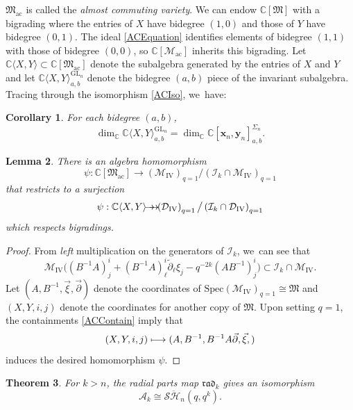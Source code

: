 \documentclass[JEP,XML,SOM,Unicode,published]{cedram}
\newcommand\mto{\mathchoice{\longmapsto}{\mapsto}{\mapsto}{\mapsto}}
\newcommand{\onto}{\mathchoice{\to\hspace*{-5mm}\to}{\to\hspace*{-2.85mm}\to}{\to\hspace*{-3mm}\to}{\to\hspace*{-3mm}\to}}
\newcommand{\GL}{\mathrm{GL}}
\newtheorem{thm}{Theorem}[section]
\newtheorem{lem}[thm]{Lemma}
\newtheorem{cor}[thm]{Corollary}
\theoremstyle{definition}
\newcommand{\CC}{\mathbb{C}}
\newcommand{\DD}{\mathcal{D}}
\newcommand{\AAA}{\mathcal{A}}
\newcommand{\MM}{\mathcal{M}}
\newcommand{\SHH}{\mathcal{S}\ddot{\mathcal{H}}}
\begin{document}
$\mathfrak{M}_{\textrm{ac}}$ is called the \textit{almost commuting variety}.
We can endow $\CC[\mathfrak{M}]$ with a bigrading where the entries of $X$ have bidegree $(1,0)$ and those of $Y$ have bidegree $(0,1)$.
The ideal \eqref{ACEquation} identifies elements of bidegree $(1,1)$ with those of bidegree $(0,0)$, so $\CC[\MM_{\mathrm{ac}}]$ inherits this bigrading.
Let $\CC\langle X,Y\rangle\subset\CC[\mathfrak{M}_{\mathrm{ac}}]$ denote the subalgebra generated by the entries of $X$ and $Y$ and let $\CC\langle X,Y\rangle^{\GL_n}_{a,b}$ denote the bidegree $(a,b)$ piece of the invariant subalgebra.
Tracing through the isomorphism \eqref{ACIso}, we~have:
\begin{cor}\label{ACCor}
For each bidegree $(a,b)$,
\[
\dim_\CC\CC\langle X,Y\rangle_{a,b}^{\GL_n}=\dim_\CC\CC[\boldsymbol{x}_n,\boldsymbol{y}_n]^{\Sigma_n}_{a,b}.
\]
\end{cor}

\begin{lem}\label{ACLem}
There is an algebra homomorphism
\[
\psi:\CC[\mathfrak{M}_{\mathrm{ac}}]\to\left(\MM_{\mathrm{IV}}\right)_{q=1}\big/\left(\mathcal{I}_k\cap\MM_{\mathrm{IV}}\right)_{q=1}
\]
that restricts to a surjection
\[
\psi:\CC\langle X,Y\rangle\onto\left(\DD_{\mathrm{IV}} \right)_{q=1}\big/\left(\mathcal{I}_k\cap\DD_{\mathrm{IV}}\right)_{q=1}
\]
which respects bigradings.
\end{lem}

\begin{proof}
From \textit{left} multiplication on the generators of $\mathcal{I}_k$, we~can see that
\begin{equation}
\MM_{\mathrm{IV}}\big((B^{-1}A)^i_j+(B^{-1}A)^i_\ell\widetilde{\partial}_{\ell}\xi_j-q^{-2k}(AB^{-1})^i_j\big)\subset\mathcal{I}_k\cap\MM_{\mathrm{IV}}.
\label{ACContain}
\end{equation}
Let $(A,B^{-1},\vec{\xi},\vec{\partial})$ denote the coordinates of $\mathrm{Spec}\left(\MM_{\mathrm{IV}}\right)_{q=1}\cong\mathfrak{M}$ and $(X,Y, i, j)$ denote the coordinates for another copy of $\mathfrak{M}$.
Upon setting $q=1$, the containments \eqref{ACContain} imply that
\[
\left(X,Y,i, j\right)\mto(A, B^{-1}, B^{-1}A\vec{\partial},\vec{\xi},)
\]
induces the desired homomorphism $\psi$.
\end{proof}

\begin{thm}\label{qkCaseThm}
For $k>n$, the radial parts map $\mathfrak{rad}_k$ gives an isomorphism
\[
\AAA_k\cong\SHH_n(q,q^k).
\]
\end{thm}
\end{document}
